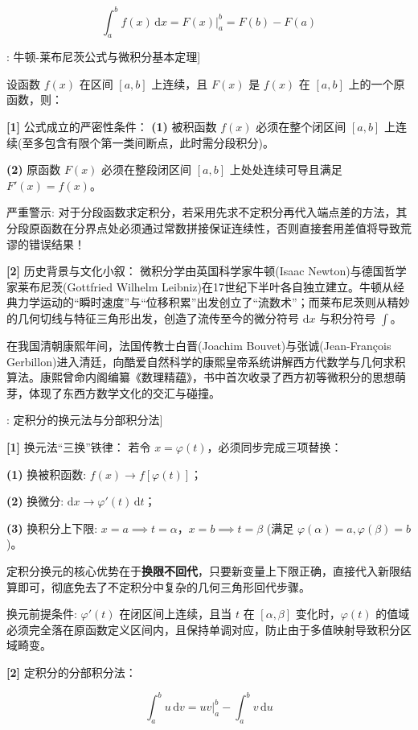 \documentclass[11pt,a4paper,UTF8]{ctexart}
\begin{document}
\begin{equation*}
\int_a^b f(x)\,\mathrm{d}x = \left. F(x) \right|_a^b = F(b) - F(a)
\end{equation*}
\begin{thmbox}[定理[1]: 牛顿-莱布尼茨公式与微积分基本定理]

设函数 $f(x)$ 在区间 $[a, b]$ 上连续，且 $F(x)$ 是 $f(x)$ 在 $[a, b]$ 上的一个原函数，则：


\textbf{[1]} 公式成立的严密性条件：
\textbf{(1)}  被积函数 $f(x)$ 必须在整个闭区间 $[a, b]$ 上连续(至多包含有限个第一类间断点，此时需分段积分)。

\textbf{(2)}  原函数 $F(x)$ 必须在整段闭区间 $[a, b]$ 上处处连续可导且满足 $F'(x) = f(x)$。

严重警示: 对于分段函数求定积分，若采用先求不定积分再代入端点差的方法，其分段原函数在分界点处必须通过常数拼接保证连续性，否则直接套用差值将导致荒谬的错误结果！

\textbf{[2]} 历史背景与文化小叙：
微积分学由英国科学家牛顿(Isaac Newton)与德国哲学家莱布尼茨(Gottfried Wilhelm Leibniz)在17世纪下半叶各自独立建立。牛顿从经典力学运动的“瞬时速度”与“位移积累”出发创立了“流数术”；而莱布尼茨则从精妙的几何切线与特征三角形出发，创造了流传至今的微分符号 $\mathrm{d}x$ 与积分符号 $\int$。

在我国清朝康熙年间，法国传教士白晋(Joachim Bouvet)与张诚(Jean-François Gerbillon)进入清廷，向酷爱自然科学的康熙皇帝系统讲解西方代数学与几何求积算法。康熙曾命内阁编纂《数理精蕴》，书中首次收录了西方初等微积分的思想萌芽，体现了东西方数学文化的交汇与碰撞。

\end{thmbox}
\begin{thmbox}[方法[1]: 定积分的换元法与分部积分法]

\textbf{[1]} 换元法“三换”铁律：
若令 $x = \varphi(t)$，必须同步完成三项替换：

\textbf{(1)}  换被积函数: $f(x) \to f[\varphi(t)]$；

\textbf{(2)}  换微分: $\mathrm{d}x \to \varphi'(t)\,\mathrm{d}t$；

\textbf{(3)}  换积分上下限: $x=a \implies t = \alpha$，$x=b \implies t = \beta$ (满足 $\varphi(\alpha)=a, \varphi(\beta)=b$)。

定积分换元的核心优势在于\textbf{换限不回代}，只要新变量上下限正确，直接代入新限结算即可，彻底免去了不定积分中复杂的几何三角形回代步骤。

换元前提条件: $\varphi'(t)$ 在闭区间上连续，且当 $t$ 在 $[\alpha, \beta]$ 变化时，$\varphi(t)$ 的值域必须完全落在原函数定义区间内，且保持单调对应，防止由于多值映射导致积分区域畸变。

\textbf{[2]} 定积分的分部积分法：

\begin{equation*}
\int_a^b u\,\mathrm{d}v = \left. uv \right|_a^b - \int_a^b v\,\mathrm{d}u
\end{equation*}


\end{thmbox}
\end{document}
